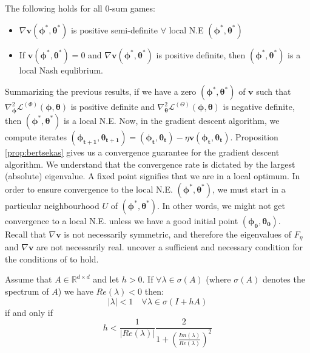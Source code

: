 \documentclass{article}
\renewcommand{\vec}[1]{\ensuremath{\boldsymbol{#1}}}
\newcommand{\vecfield}{\vec{v}}
\begin{document}
\begin{cor}\label{cor:stationary-point}
    The following holds for all $0$-sum games:
    \begin{itemize}
    \item $\nabla\vec{v}(\vec{\phi}^*,\vec{\theta}^*)$ is positive semi-definite $\forall$ local N.E $(\vec{\phi^*},\vec{\theta^*})$
    
    \item If $\vecfield(\vec{\phi^*},\vec{\theta^*}) = 0$ and $\nabla\vec{v}(\vec{\phi^*},\vec{\theta^*})$ is positive definite, then $(\vec{\phi^*},\vec{\theta^*})$ is a local Nash equlibrium. 
    \end{itemize}
\end{cor}

Summarizing the previous results, if we have a zero $(\vec{\phi^*},\vec{\theta^*})$ of $\vec{v}$ such that $\nabla_{\vec{\phi}}^2 \mathcal{L}^{(\Phi)}(\vec{\phi},\vec{\theta})$ is positive definite and $\nabla_{\vec{\theta}}^2 \mathcal{L}^{(\Theta)}(\vec{\phi},\vec{\theta})$ is negative definite, then $(\vec{\phi^*},\vec{\theta^*})$ is a local N.E. Now, in the gradient descent algorithm, we compute iterates $(\vec{\phi_{t+1}},\vec{\theta_{t+1}}) = (\vec{\phi_t},\vec{\theta_t}) - \eta \vec{v}(\vec{\phi_t},\vec{\theta_t})$. Proposition \ref{prop:bertsekas} gives us a convergence guarantee for the gradient descent algorithm. We understand that the convergence rate is dictated by the largest (absolute) eigenvalue. A fixed point signifies that we are in a local optimum. In order to ensure convergence to the local N.E. $(\vec{\phi^*},\vec{\theta^*})$, we must start in a particular neighbourhood $U$ of $(\vec{\phi^*},\vec{\theta^*})$. In other words, we might not get convergence to a local N.E. unless we have a good initial point $(\vec{\phi_0},\vec{\theta_0})$.\\

Recall that $\nabla\vec{v}$ is not necessarily symmetric, and therefore the eigenvalues of $F_\eta$ and $\nabla\vec{v}$ are not necessarily real.  \citet{MeschederNG17a} uncover a sufficient and necessary condition for the conditions of  to hold.

\begin{lem} Assume that $A \in \mathbb{R}^{d\times d}$ and let $h > 0$. If $\forall \lambda \in \sigma(A)$ (where $\sigma(A)$ denotes the spectrum of $A$) we have $Re(\lambda)<0$ then:
\[
|\lambda| < 1 \quad \forall \lambda \in \sigma(I+hA)
\]
if and only if
\[
h < \frac{1}{|Re(\lambda)|} \frac{2}{1+(\frac{Im(\lambda)}{Re(\lambda)})^2}
\]
\end{lem}
\end{document}
